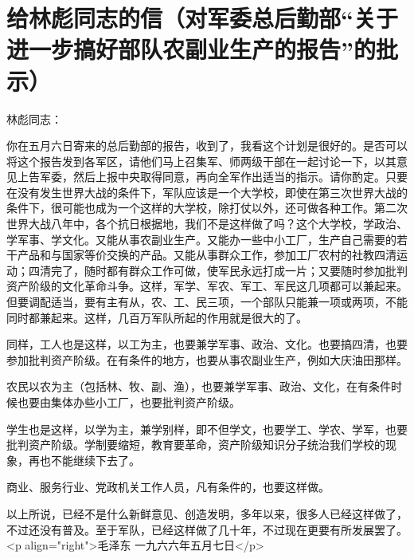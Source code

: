 \section[给林彪同志的信（对军委总后勤部“关于进一步搞好部队农副业生产的报告”的批示）（一九六六年五月七日）]{给林彪同志的信（对军委总后勤部“关于进一步搞好部队农副业生产的报告”的批示）}


林彪同志：

你在五月六日寄来的总后勤部的报告，收到了，我看这个计划是很好的。是否可以将这个报告发到各军区，请他们马上召集军、师两级干部在一起讨论一下，以其意见上告军委，然后上报中央取得同意，再向全军作出适当的指示。请你酌定。只要在没有发生世界大战的条件下，军队应该是一个大学校，即使在第三次世界大战的条件下，很可能也成为一个这样的大学校，除打仗以外，还可做各种工作。第二次世界大战八年中，各个抗日根据地，我们不是这样做了吗？这个大学校，学政治、学军事、学文化。又能从事农副业生产。又能办一些中小工厂，生产自己需要的若干产品和与国家等价交换的产品。又能从事群众工作，参加工厂农村的社教四清运动；四清完了，随时都有群众工作可做，使军民永远打成一片；又要随时参加批判资产阶级的文化革命斗争。这样，军学、军农、军工、军民这几项都可以兼起来。但要调配适当，要有主有从，农、工、民三项，一个部队只能兼一项或两项，不能同时都兼起来。这样，几百万军队所起的作用就是很大的了。

同样，工人也是这样，以工为主，也要兼学军事、政治、文化。也要搞四清，也要参加批判资产阶级。在有条件的地方，也要从事农副业生产，例如大庆油田那样。

农民以农为主（包括林、牧、副、渔），也要兼学军事、政治、文化，在有条件时候也要由集体办些小工厂，也要批判资产阶级。

学生也是这样，以学为主，兼学别样，即不但学文，也要学工、学农、学军，也要批判资产阶级。学制要缩短，教育要革命，资产阶级知识分子统治我们学校的现象，再也不能继续下去了。

商业、服务行业、党政机关工作人员，凡有条件的，也要这样做。

以上所说，已经不是什么新鲜意见、创造发明，多年以来，很多人已经这样做了，不过还没有普及。至于军队，已经这样做了几十年，不过现在更要有所发展罢了。
<p align="right">毛泽东
一九六六年五月七日</p>


